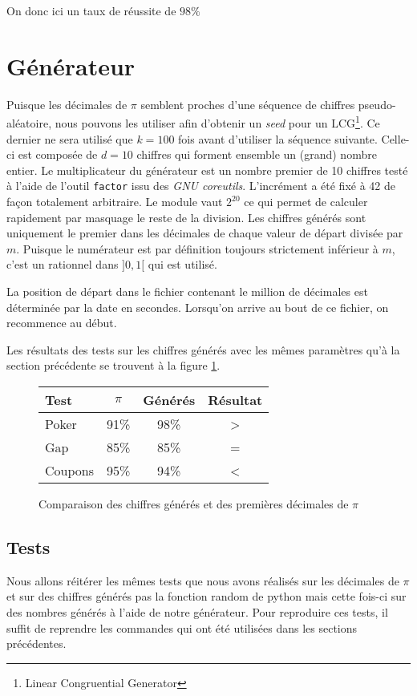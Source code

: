 \documentclass[12pt,a4paper]{article}
\begin{document}
On donc ici un taux de réussite de $98\%$
\section{Générateur}
Puisque les décimales de $\pi$ semblent proches d'une séquence de chiffres
pseudo-aléatoire, nous pouvons les utiliser afin d'obtenir un \textit{seed}
pour un LCG\footnote{Linear Congruential Generator}. Ce dernier ne sera utilisé
que $k=100$ fois avant d'utiliser la séquence suivante. Celle-ci est composée de
$d=10$ chiffres qui forment ensemble un (grand) nombre entier.
Le multiplicateur du générateur est un nombre premier de 10 chiffres testé
à l'aide de l'outil \texttt{factor} issu des \textit{GNU coreutils}.
L'incrément a été fixé à 42 de façon totalement arbitraire.
Le module vaut $2^{20}$ ce qui permet de calculer rapidement par masquage
le reste de la division.
Les chiffres générés sont uniquement le premier dans les décimales de chaque
valeur de départ divisée par $m$.
Puisque le numérateur est par définition toujours strictement inférieur à $m$,
c'est un rationnel dans $]0,1[$ qui est utilisé.

La position de départ dans le fichier contenant le million de décimales
est déterminée par la date en secondes. Lorsqu'on arrive au bout de ce fichier,
on recommence au début.

Les résultats des tests sur les chiffres générés avec les mêmes paramètres
qu'à la section précédente se trouvent à la figure \ref{fig:genD}.

\begin{figure}
\center
\begin{tabular}{l|c|c|c}
Test & $\pi$ & Générés & Résultat \\ \hline \hline
Poker & 91\% & 98\% & > \\ \hline
Gap & 85\% & 85\% & = \\ \hline
Coupons & 95\% & 94\% & <
\end{tabular}
\caption{Comparaison des chiffres générés et des premières décimales de $\pi$}
\label{fig:genD}
\end{figure}

\subsection{Tests}
Nous allons réitérer les mêmes tests que nous avons réalisés sur les décimales de $\pi$ et sur des chiffres générés pas la fonction random de python mais cette fois-ci sur des nombres générés à l'aide de notre générateur.
Pour reproduire ces tests, il suffit de reprendre les commandes qui ont été utilisées dans les sections précédentes.
\end{document}
